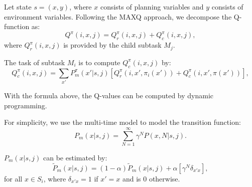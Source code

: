 Let state $s = (x, y)$, where $x$ consists of planning variables and $y$ consists of environment
variables. Following the MAXQ approach, we decompose the Q-function as:
\begin{equation}
    Q^{\pi}(i, x, j) = Q_r^{\pi}(i, x, j) + Q_c^{\pi}(i, x, j),
    \label{eq:biasedMaxQ}
\end{equation}
where $Q_r^{\pi}(i, x, j)$ is provided by the child subtask $M_j$.

The task of subtask $M_i$ is to compute $Q_c^{\pi}(i, x, j)$ by:
\begin{equation}
    Q_c^{\pi}(i, x, j) = \sum_{x'} P_m^{\pi}(x'|s, j)[Q_r^{\pi}(i, x', \pi_i(x')) + Q_c^{\pi}(i, x', \pi(x'))],
    \label{eq:biasedQc}
\end{equation}

With the formula above, the Q-values can be computed by dynamic programming.

For simplicity, we use the multi-time model \cite{SMDP} to model the transition function: 
\begin{equation}
    P_m(x|s, j) = \sum^{\infty}_{N=1} \gamma^N P(x, N|s, j).
    \label{eq:multiProb}
\end{equation}

$P_m(x|s, j)$ can be estimated by:
\begin{equation}
    \tilde{P}_m(x|s, j) = (1-\alpha)\tilde{P}_m(x|s, j) + \alpha [ \gamma^N \delta_{x'x}],
    \label{eq:approxP}
\end{equation}
for all $x \in S_i$, where $\delta_{x'x}=1$ if $x' = x$ and is 0 otherwise.


